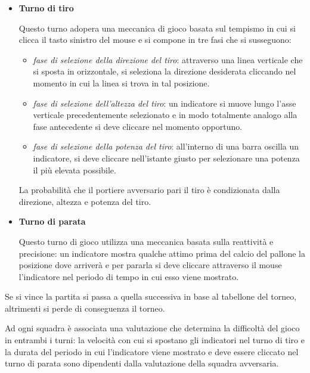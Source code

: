 \documentclass[12pt,a4paper]{report}
\begin{document}
\begin{itemize}
\item \textbf{Turno di tiro}

Questo turno adopera una meccanica di gioco basata sul tempismo in cui si clicca il tasto sinistro del mouse e si compone in tre fasi che si susseguono: 

\begin{itemize}
      \item \emph{fase di selezione della direzione del tiro}: attraverso una linea verticale che si sposta in orizzontale, si seleziona la direzione desiderata cliccando nel momento in cui la linea si trova in tal posizione.
            
            
      \item \emph{fase di selezione dell’altezza del tiro}: un indicatore si muove lungo l’asse verticale precedentemente selezionato e in modo totalmente analogo alla fase antecedente si deve cliccare nel momento opportuno.
      
      \item \emph{fase di selezione della potenza del tiro}: all’interno di una barra oscilla un indicatore, si deve cliccare nell’istante giusto per selezionare una potenza il più elevata possibile.
      
\end{itemize}

La probabilità che il portiere avversario pari il tiro è condizionata dalla direzione, altezza e potenza del tiro.
\vspace{0.2cm}

\item \textbf{Turno di parata}

      Questo turno di gioco utilizza una meccanica basata sulla reattività e precisione: un indicatore mostra qualche attimo prima del calcio del pallone la posizione dove arriverà e per pararla si deve cliccare attraverso il mouse l’indicatore nel periodo di tempo in cui esso viene mostrato.
\end{itemize}
Se si vince la partita si passa a quella successiva in base al tabellone del torneo, altrimenti si perde di conseguenza il torneo.

Ad ogni squadra è associata una valutazione che determina la difficoltà del gioco in entrambi i turni: la velocità con cui si spostano gli indicatori nel turno di tiro e la durata del periodo in cui l’indicatore viene mostrato e deve essere cliccato nel turno di parata sono dipendenti dalla valutazione della squadra avversaria.
\end{document}
